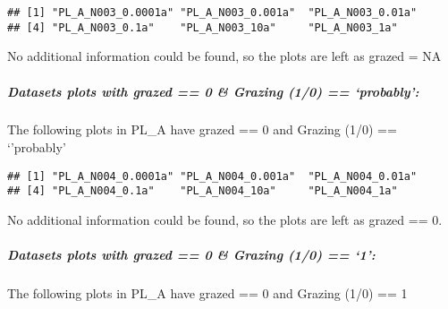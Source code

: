 \documentclass[table]{article}
\let\oldsubparagraph\subparagraph
\renewcommand{\subparagraph}[1]{\oldsubparagraph{#1}\mbox{}}
\begin{document}
\begin{verbatim}
## [1] "PL_A_N003_0.0001a" "PL_A_N003_0.001a"  "PL_A_N003_0.01a"  
## [4] "PL_A_N003_0.1a"    "PL_A_N003_10a"     "PL_A_N003_1a"
\end{verbatim}

No additional information could be found, so the plots are left as
grazed = NA

\subparagraph{\texorpdfstring{\emph{Datasets plots with grazed == 0 \&
Grazing (1/0) ==
`probably':}}{Datasets plots with grazed == 0 \& Grazing (1/0) == probably:}}\label{datasets-plots-with-grazed-0-grazing-10-probably}

The following plots in PL\_A have grazed == 0 and Grazing (1/0) ==
`'probably'

\begin{verbatim}
## [1] "PL_A_N004_0.0001a" "PL_A_N004_0.001a"  "PL_A_N004_0.01a"  
## [4] "PL_A_N004_0.1a"    "PL_A_N004_10a"     "PL_A_N004_1a"
\end{verbatim}

No additional information could be found, so the plots are left as
grazed == 0.

\subparagraph{\texorpdfstring{\emph{Datasets plots with grazed == 0 \&
Grazing (1/0) ==
`1':}}{Datasets plots with grazed == 0 \& Grazing (1/0) == 1:}}\label{datasets-plots-with-grazed-0-grazing-10-1}

The following plots in PL\_A have grazed == 0 and Grazing (1/0) == 1
\end{document}
